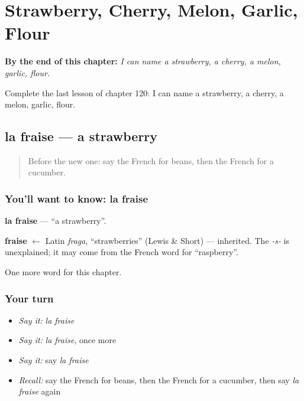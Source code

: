 
\chapter{Strawberry, Cherry, Melon, Garlic, Flour}
\label{ch:fr-strawberry-cherry-melon-garlic-flour}

\begin{chapteropening}
\textbf{By the end of this chapter:} \emph{I can name a strawberry, a cherry, a melon, garlic, flour.}

Complete the last lesson of chapter 120: I can name a strawberry, a cherry, a melon, garlic, flour.
\end{chapteropening}

\section[la fraise]{la fraise — a strawberry}

\label{lesson:FR-C120-fraise}



\begin{quote}
Before the new one: say the French for beans, then the French for a cucumber.
\end{quote}

\subsection*{You'll want to know: la fraise}
\textbf{la fraise} — \textquotedblleft{}a strawberry\textquotedblright{}.

\begin{cousinweb}
\textbf{fraise} $\leftarrow$ Latin \emph{fraga}, \textquotedblleft{}strawberries\textquotedblright{} (Lewis \& Short) — inherited. The \emph{-s-} is unexplained; it may come from the French word for \textquotedblleft{}raspberry\textquotedblright{}.
\end{cousinweb}

\begin{grammarlens}[title={What you've built}]
One more word for this chapter.
\end{grammarlens}

\subsection*{Your turn}
\begin{itemize}
\raggedright
  \item \emph{Say it:} \emph{la fraise}
  \item \emph{Say it:} \emph{la fraise}, once more
  \item \emph{Say it:} say \emph{la fraise}
  \item \emph{Recall:} say the French for beans, then the French for a cucumber, then say \emph{la fraise} again
\end{itemize}

